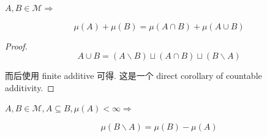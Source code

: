 \documentclass{qlnotes-export}
\begin{document}
\begin{lemma}

\(A,B \in \mathcal{M}\Longrightarrow\)

\[\mu(A) + \mu(B) = \mu(A \cap B) + \mu(A \cup B)\]

\end{lemma}

\begin{proof}

\[A \cup B = (A\backslash B) \sqcup (A \cap B) \sqcup (B\backslash A)\]

而后使用 finite additive 可得. 这是一个 direct corollary of countable additivity.

\end{proof}

\begin{corollary}

\(A,B \in \mathcal{M},A \subseteq B,\mu(A) < \infty\Longrightarrow\)

\[\mu(B\backslash A) = \mu(B) - \mu(A)\]

\end{corollary}
\end{document}
